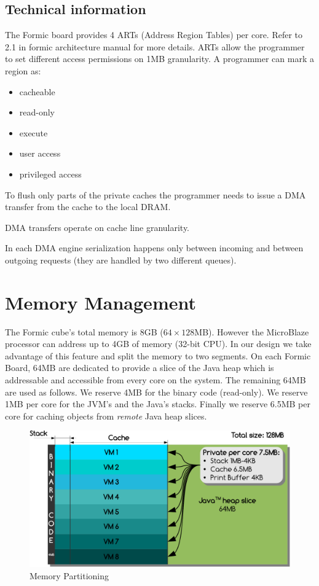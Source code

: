 \documentclass[
a4paper,
12pt,
]{report}
\newcommand{\mblaze}{MicroBlaze\texttrademark\xspace}
\newcommand{\java}{Java\texttrademark\xspace}
\begin{document}
\subsection{Technical information}
The Formic board provides 4 ARTs (Address Region Tables) per core.
Refer to 2.1 in formic architecture manual for more details.  ARTs
allow the programmer to set different access permissions on 1MB
granularity.  A programmer can mark a region as:

\begin{itemize}
\item cacheable
\item read-only
\item execute
\item user access
\item privileged access
\end{itemize}

To flush only parts of the private caches the programmer needs to
issue a DMA transfer from the cache to the local DRAM.

DMA transfers operate on cache line granularity.

In each DMA engine serialization happens only between incoming and
between outgoing requests (they are handled by two different queues).

\section{Memory Management}
The Formic cube's total memory is 8GB ($64\times128$MB). However the
\mblaze processor can address up to 4GB of memory (32-bit CPU). In our
design we take advantage of this feature and split the memory to two
segments. On each Formic Board, 64MB are dedicated to provide a slice
of the \java heap which is addressable and accessible from every core
on the system. The remaining 64MB are used as follows. We reserve 4MB
for the binary code (read-only). We reserve 1MB per core for the
JVM's and the \java's stacks. Finally we reserve 6.5MB per core for
caching objects from \textit{remote} \java heap slices.

\begin{figure}[!ht]
  \centering
  \includegraphics[width=\linewidth]{memmap}
  \caption{Memory Partitioning}
  \label{fig:memmap}
\end{figure}
\end{document}

